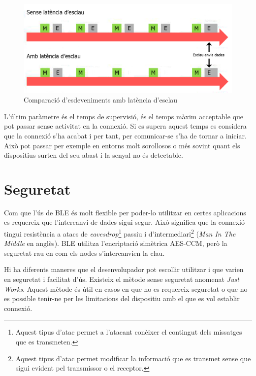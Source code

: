 \begin{figure}[!h]
	\begin{center}
		\includegraphics{./images/slave_latency_new.png}
		\caption{Comparació d'esdeveniments amb latència d'esclau \cite{slave_latency}}
		\label{fig:slave_latency}
	\end{center}
\end{figure}

L'últim paràmetre és el temps de supervisió, és el temps màxim acceptable que pot passar sense activitat en la connexió.
Si es supera aquest temps es considera que la connexió s'ha acabat i per tant, per comunicar-se s'ha de tornar a iniciar.
Això pot passar per exemple en entorns molt sorollosos o més sovint quant els dispositius surten del seu abast i la senyal no és detectable.

\section{Seguretat}
\label{sec:security}
Com que l'ús de BLE és molt flexible per poder-lo utilitzar en certes aplicacions es requereix que l'intercanvi de dades sigui segur.
Això significa que la connexió tingui resistència a atacs de \textit{eavesdrop}\footnote{Aquest tipus d'atac permet a l'atacant conèixer el contingut dels missatges que es transmeten.} passiu i d'intermediari\footnote{Aquest tipus d'atac permet modificar la informació que es transmet sense que sigui evident pel transmissor o el receptor.} (\textit{Man In The Middle} en anglès).
BLE utilitza l'encriptació simètrica AES-CCM, però la seguretat rau en com els nodes s'intercanvien la clau.

Hi ha diferents maneres que el desenvolupador pot escollir utilitzar i que varien en seguretat i facilitat d'ús.
Existeix el mètode sense seguretat anomenat \textit{Just Works}.
Aquest mètode és útil en casos en que no es requereix seguretat o que no es possible tenir-ne per les limitacions del dispositiu amb el que es vol establir connexió.

